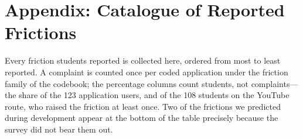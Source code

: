 
\section*{Appendix: Catalogue of Reported Frictions}

Every friction students reported is collected here, ordered from most to
least reported. A complaint is counted once per coded application under the
friction family of the codebook; the percentage columns count students, not
complaints---the share of the 123 application users, and of the 108 students
on the YouTube route, who raised the friction at least once. Two of the
frictions we predicted during development appear at the bottom of the table
precisely because the survey did not bear them out.

